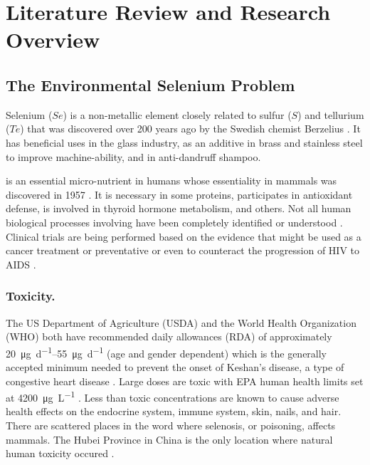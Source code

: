 \chapter{Literature Review and Research Overview}
\label{chap:litreview}

\begin{linenumbers}[1]

\section{The Environmental Selenium Problem}
\label{sec:the selenium problem}

Selenium ($ Se $) is a non-metallic element closely related to sulfur ($ S $) and tellurium ($ Te $) that was discovered over 200 years ago by the Swedish chemist Berzelius \parencite{scott1973}.  It has beneficial uses in the glass industry, as an additive in brass and stainless steel to improve machine-ability, and in anti-dandruff shampoo.  

\Se is an essential micro-nutrient in humans whose essentiality in mammals was discovered in 1957 \parencite{schwarz1957}.   It is necessary in some proteins, participates in antioxidant defense, is involved in thyroid hormone metabolism, and others.  Not all human biological processes involving \Se have been completely identified or understood \parencite{rayman2000,navarro2000,roman2014}.  Clinical trials are being performed based on the evidence that \Se might be used as a cancer treatment or preventative or even to counteract the progression of HIV to AIDS \parencite{rayman2000,roman2014}.

\subsection*{\Se Toxicity.}
The US Department of Agriculture (USDA) and the World Health Organization (WHO) both have recommended daily allowances (RDA) of approximately \SIrange{20}{55}{\micro\g\per\day} (age and gender dependent) which is the generally accepted minimum needed to prevent the onset of Keshan's disease, a type of congestive heart disease \parencite{world1996,USDA2010}.  Large \Se doses are toxic \parencite{roman2014,navarro2000} with EPA human health limits set at \SI{4200}{\micro\g\per\liter} \parencite{EPA-Se}.  Less than toxic concentrations are known to cause adverse health effects on the endocrine system, immune system, skin, nails, and hair.  There are scattered places in the word where selenosis, or \Se poisoning, affects mammals.  The Hubei Province in China is the only location where natural human \Se toxicity occured \parencite{2002Spallholz}.


\end{linenumbers}
